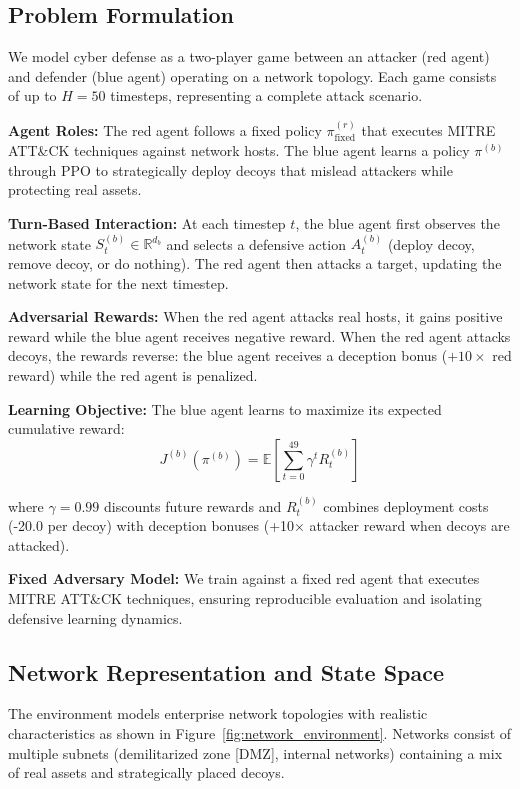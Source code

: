 \documentclass[12pt,oneside]{article}
\begin{document}
\subsection{Problem Formulation}

We model cyber defense as a two-player game between an attacker (red agent) and defender (blue agent) operating on a network topology. Each game consists of up to $H = 50$ timesteps, representing a complete attack scenario.

\textbf{Agent Roles:} The red agent follows a fixed policy $\pi^{(r)}_{\text{fixed}}$ that executes MITRE ATT\&CK techniques against network hosts. The blue agent learns a policy $\pi^{(b)}$ through PPO to strategically deploy decoys that mislead attackers while protecting real assets.

\textbf{Turn-Based Interaction:} At each timestep $t$, the blue agent first observes the network state $S_t^{(b)} \in \mathbb{R}^{d_b}$ and selects a defensive action $A_t^{(b)}$ (deploy decoy, remove decoy, or do nothing). The red agent then attacks a target, updating the network state for the next timestep.

\textbf{Adversarial Rewards:} When the red agent attacks real hosts, it gains positive reward while the blue agent receives negative reward. When the red agent attacks decoys, the rewards reverse: the blue agent receives a deception bonus ($+10 \times$ red reward) while the red agent is penalized.

\textbf{Learning Objective:} The blue agent learns to maximize its expected cumulative reward:
\begin{equation}
J^{(b)}(\pi^{(b)}) = \mathbb{E}\left[\sum_{t=0}^{49} \gamma^t R_t^{(b)}\right]
\label{eq:blue_objective}
\end{equation}

where $\gamma = 0.99$ discounts future rewards and $R_t^{(b)}$ combines deployment costs (-20.0 per decoy) with deception bonuses (+10× attacker reward when decoys are attacked).

\textbf{Fixed Adversary Model:} We train against a fixed red agent that executes MITRE ATT\&CK techniques, ensuring reproducible evaluation and isolating defensive learning dynamics.

\subsection{Network Representation and State Space}

The environment models enterprise network topologies with realistic characteristics as shown in Figure~\ref{fig:network_environment}. Networks consist of multiple subnets (demilitarized zone [DMZ], internal networks) containing a mix of real assets and strategically placed decoys.
\end{document}
